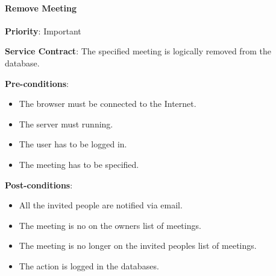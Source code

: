	    \paragraph{Remove Meeting}
			\begin{description}
			    \item{\textbf{Priority}:} Important %
			    \item{\textbf{Service Contract}:} The specified meeting is logically removed from the database.%
			    \item{\textbf{Pre-conditions}:}%
    			    \begin{itemize}
    			        \item The browser must be connected to the Internet.
    			        \item The server must running.
    			        \item The user has to be logged in. 
    			        \item The meeting has to be specified.
    			    \end{itemize}
			    \item{\textbf{Post-conditions}:} %
    			    \begin{itemize}
    			    \item All the invited people are notified via email.
    			    \item The meeting is no on the owners list of meetings.
    			    \item The meeting is no longer on the invited peoples list of meetings.
    			    \item The action is logged in the databases.
    			    \end{itemize}
			\end{description}
			
					
							
			
